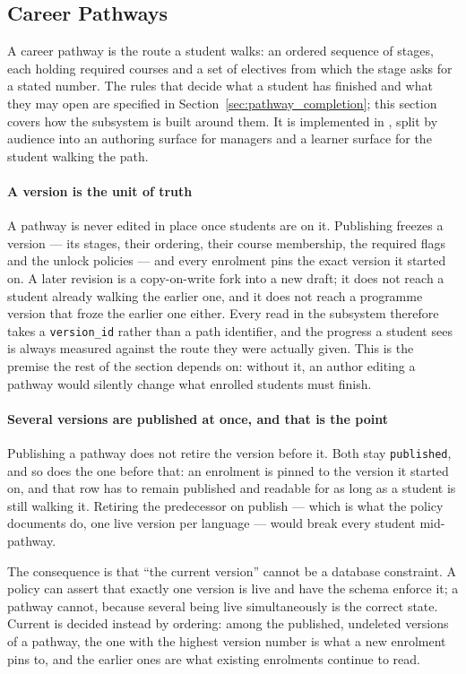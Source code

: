 \subsection{Career Pathways}
\label{sec:impl_career_paths}

A career pathway is the route a student walks: an ordered sequence of stages, each holding required courses and a set of electives from which the stage asks for a stated number. The rules that decide what a student has finished and what they may open are specified in Section~\ref{sec:pathway_completion}; this section covers how the subsystem is built around them. It is implemented in , split by audience into an authoring surface for managers and a learner surface for the student walking the path.

\paragraph{A version is the unit of truth}
A pathway is never edited in place once students are on it. Publishing freezes a version --- its stages, their ordering, their course membership, the required flags and the unlock policies --- and every enrolment pins the exact version it started on. A later revision is a copy-on-write fork into a new draft; it does not reach a student already walking the earlier one, and it does not reach a programme version that froze the earlier one either. Every read in the subsystem therefore takes a \texttt{version\_id} rather than a path identifier, and the progress a student sees is always measured against the route they were actually given. This is the premise the rest of the section depends on: without it, an author editing a pathway would silently change what enrolled students must finish.

\paragraph{Several versions are published at once, and that is the point}
Publishing a pathway does not retire the version before it. Both stay \texttt{published}, and so does the one before that: an enrolment is pinned to the version it started on, and that row has to remain published and readable for as long as a student is still walking it. Retiring the predecessor on publish --- which is what the policy documents do, one live version per language --- would break every student mid-pathway.

The consequence is that ``the current version'' cannot be a database constraint. A policy can assert that exactly one version is live and have the schema enforce it; a pathway cannot, because several being live simultaneously is the correct state. Current is decided instead by ordering: among the published, undeleted versions of a pathway, the one with the highest version number is what a new enrolment pins to, and the earlier ones are what existing enrolments continue to read.

